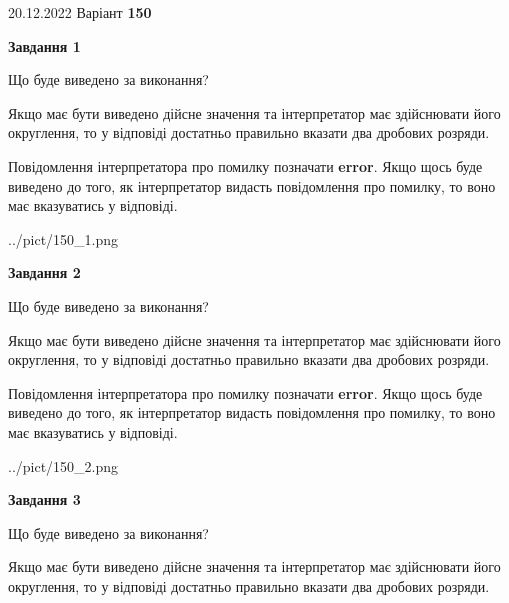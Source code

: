 \documentclass[12pt, ukrainian]{article}
\begin{document}
{20.12.2022 Варіант \No \textbf { 150 }\par}
{
\begin {Large}

{\begin {center}\textbf{Завдання 1}\end {center}}\par
Що буде виведено за виконання? \par

Якщо має бути виведено дійсне значення та інтерпретатор має здійснювати його округлення, 
то у відповіді достатньо правильно вказати два дробових розряди.

Повідомлення інтерпретатора про помилку позначати \textbf{error}.
Якщо щось буде виведено до того, як інтерпретатор видасть повідомлення про помилку, 
то воно має вказуватись у відповіді. \par

\begin{center}
	{../pict/150_1.png}
\end{center}
\newpage

{\begin {center}\textbf{Завдання 2}\end {center}}\par
Що буде виведено за виконання? \par

Якщо має бути виведено дійсне значення та інтерпретатор має здійснювати його округлення, 
то у відповіді достатньо правильно вказати два дробових розряди.

Повідомлення інтерпретатора про помилку позначати \textbf{error}.
Якщо щось буде виведено до того, як інтерпретатор видасть повідомлення про помилку, 
то воно має вказуватись у відповіді. \par

\begin{center}
	{../pict/150_2.png}
\end{center}
\newpage

{\begin {center}\textbf{Завдання 3}\end {center}}\par
Що буде виведено за виконання? \par

Якщо має бути виведено дійсне значення та інтерпретатор має здійснювати його округлення, 
то у відповіді достатньо правильно вказати два дробових розряди.


\end{Large}}
\end{document}
